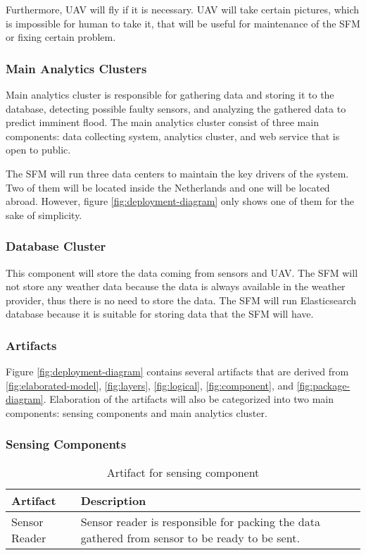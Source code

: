 Furthermore, \gls{UAV} will fly if it is necessary. \gls{UAV} will take certain pictures, which is impossible for human to take it, that will be useful for maintenance of the \gls{SFM} or fixing certain problem.

\subsubsection*{Main Analytics Clusters}
Main analytics cluster is responsible for gathering data and storing it to the database, detecting possible faulty sensors, and analyzing the gathered data to predict imminent flood. The main analytics cluster consist of three main components: data collecting system, analytics cluster, and web service that is open to public.

The \gls{SFM} will run three data centers to maintain the key drivers of the system. Two of them will be located inside the Netherlands and one will be located abroad. However, figure \ref{fig:deployment-diagram} only shows one of them for the sake of simplicity.

\subsubsection*{Database Cluster}
This component will store the data coming from sensors and \gls{UAV}. The \gls{SFM} will not store any weather data because the data is always available in the weather provider, thus there is no need to store the data. The \gls{SFM} will run Elasticsearch database because it is suitable for storing data that the \gls{SFM} will have.

\subsubsection{Artifacts}
Figure \ref{fig:deployment-diagram} contains several artifacts that are derived from \autoref{fig:elaborated-model}, \autoref{fig:layers}, \autoref{fig:logical}, \autoref{fig:component}, and \autoref{fig:package-diagram}. Elaboration of the artifacts will also be categorized into two main components: sensing components and main analytics cluster.

\subsubsection*{Sensing Components}
\begin{table}[H]
	\begin{tabular}{L{0.2\textwidth} L{0.6\textwidth}}
		\textbf{Artifact} & \textbf{Description}                                                                           \\ \toprule
		Sensor Reader     & Sensor reader is responsible for packing the data gathered from sensor to be ready to be sent. \\ \bottomrule
	\end{tabular}
	\caption{Artifact for sensing component}
	\label{table:sensing-artifacts}
\end{table}

